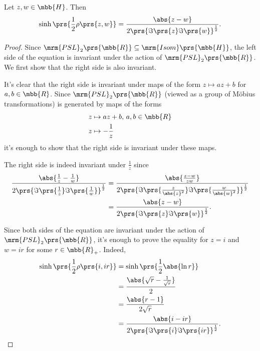 \documentclass[10pt, twoside]{book}
\begin{document}
\begin{theorem}
Let $z,w \in \mbb{H}$. Then
\begin{align*}
\sinh\prs{\frac{1}{2} \rho\prs{z,w}} = \frac{\abs{z-w}}{2 \prs {\Im\prs{z} \Im\prs{w}}^{\frac{1}{2}}} \text{.}
\end{align*}

\begin{proof}
Since $\mrm{PSL}_2\prs{\mbb{R}} \subseteq \mrm{Isom}\prs{\mbb{H}}$, the left side of the equation is invariant under the action of $\mrm{PSL}_2\prs{\mbb{R}}$. We first show that the right side is also invariant.

It's clear that the right side is invariant under maps of the form $z \mapsto az + b$ for $a,b \in \mbb{R}$. Since $\mrm{PSL}_2\prs{\mbb{R}}$ (viewed as a group of Möbius transformations) is generated by maps of the forms
\begin{align*}
z &\mapsto az + b, \, a,b\in\mbb{R} \\
z &\mapsto - \frac{1}{z}
\end{align*}
it's enough to show that the right side is invariant under these maps.

The right side is indeed invariant under $\frac{1}{z}$ since
\begin{align*}
\frac{\abs{\frac{1}{z} - \frac{1}{w}}}{2 \prs{\Im\prs{\frac{1}{z}} \Im\prs{\frac{1}{w}}}^{\frac{1}{2}}}
&=
\frac{\abs{\frac{z-w}{zw}}}{2 \prs{\Im\prs{\frac{z}{\abs{z}^2}} \Im\prs{\frac{w}{\abs{w}^2}}}^{\frac{1}{2}}}
\\&=
\frac{\abs{z-w}}{2 \prs{\Im\prs{z}\Im\prs{w}}^{\frac{1}{2}}} \text{.}
\end{align*}

Since both sides of the equation are invariant under the action of $\mrm{PSL}_2\prs{\mbb{R}}$, it's enough to prove the equality for $z=i$ and $w = ir$ for some $r \in \mbb{R}_+$.
Indeed,
\begin{align*}
\sinh\prs{\frac{1}{2} \rho\prs{i, ir}} &=
\sinh\prs{\frac{1}{2} \abs{\ln r}}
\\&=
\frac{\abs{\sqrt{r} - \frac{1}{\sqrt{r}}}}{2}
\\&=
\frac{\abs{r-1}}{2 \sqrt{r}}
\\&=
\frac{\abs{i - ir}}{2 \prs{\Im\prs{i} \Im\prs{ir}}^{\frac{1}{2}}} \text{.}
\end{align*}

\end{proof}
\end{theorem}
\end{document}
